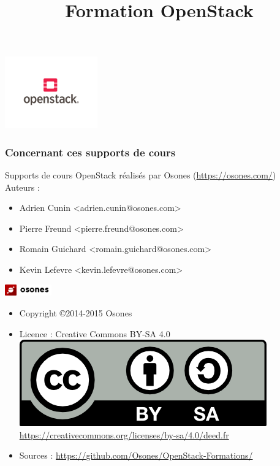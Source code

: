 \usepackage[utf8]{inputenc}
\usepackage{graphicx}
\usepackage{xparse}
\usepackage{microtype}
\usepackage{verbatim}


\title{Formation OpenStack}



  \begin{frame}
    \titlepage
    \begin{center}
      \includegraphics[width=4cm]{images/openstack.png}
    \end{center}
  \end{frame}

  \begin{frame}
    \frametitle{Concernant ces supports de cours}
    Supports de cours OpenStack réalisés par Osones (\url{https://osones.com/})\\
    Auteurs :
    \begin{itemize}
      \item Adrien Cunin \textless adrien.cunin@osones.com\textgreater
      \item Pierre Freund \textless pierre.freund@osones.com\textgreater
      \item Romain Guichard \textless romain.guichard@osones.com\textgreater
      \item Kevin Lefevre \textless kevin.lefevre@osones.com\textgreater
    \end{itemize}
    \begin{center}
      \includegraphics[height=0.5cm]{images/logo-osones.png}
    \end{center}
    \begin{itemize}
      \item Copyright \copyright{2014-2015 Osones}
      \item Licence : Creative Commons BY-SA 4.0 \\
        \includegraphics{images/licence.png} \\
        \url{https://creativecommons.org/licenses/by-sa/4.0/deed.fr}
      \item Sources : \url{https://github.com/Osones/OpenStack-Formations/}
    \end{itemize}
  \end{frame}

